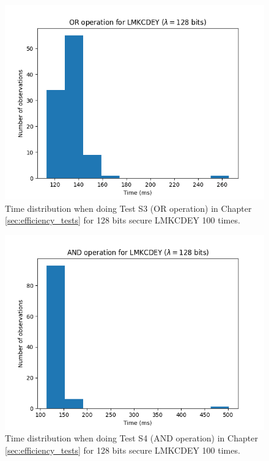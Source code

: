 \begin{figure}[ht]
    \centering
    \includegraphics[width=0.8\linewidth]{data/figures/LMKCDEY_STD128LMKCDEY_OR_operation.png}
    \caption{Time distribution when doing Test S3 (OR operation) in Chapter \ref{sec:efficiency_tests} for 128 bits secure LMKCDEY 100 times.}
    \label{fig:distr_lmkcdey128_or}
\end{figure}

\begin{figure}[ht]
    \centering
    \includegraphics[width=0.8\linewidth]{data/figures/LMKCDEY_STD128LMKCDEY_AND_operation.png}
    \caption{Time distribution when doing Test S4 (AND operation) in Chapter \ref{sec:efficiency_tests} for 128 bits secure LMKCDEY 100 times.}
    \label{fig:distr_lmkcdey128_and}
\end{figure}

